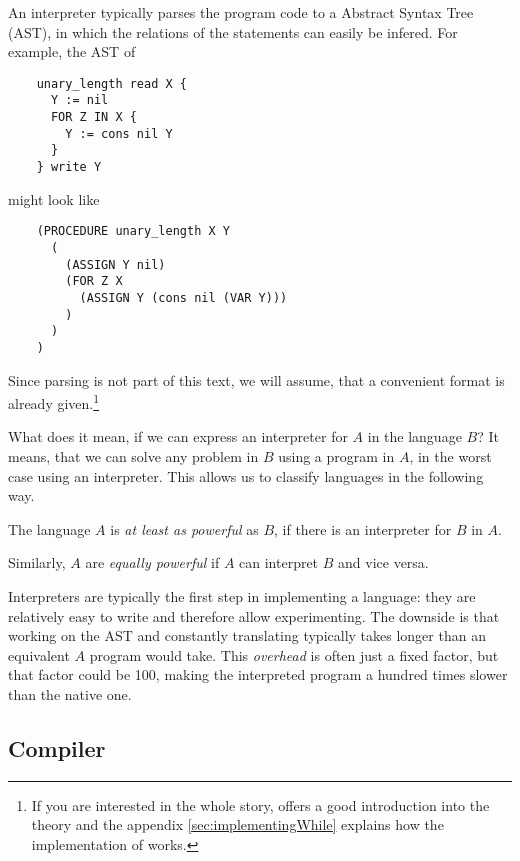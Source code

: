 An interpreter typically parses the program code to a Abstract Syntax Tree 
(AST), in which the relations of the statements can easily be infered. For 
example, the AST of

\begin{verbatim}
	unary_length read X {
	  Y := nil
	  FOR Z IN X {
	    Y := cons nil Y
	  }
	} write Y
\end{verbatim}

might look like

\begin{verbatim}
	(PROCEDURE unary_length X Y
	  (
	    (ASSIGN Y nil)
	    (FOR Z X
	      (ASSIGN Y (cons nil (VAR Y)))
	    )
	  )
	)
\end{verbatim}

Since parsing is not part of this text, we will assume, that a convenient 
format is already given.\footnote{If you are interested in the whole story, 
	\cite{aho2007compilers} offers a good introduction into the theory and the 
	appendix \ref{sec:implementingWhile} explains how the implementation of 
\WHILE works.}

What does it mean, if we can express an interpreter for $A$ in the language 
$B$? It means, that we can solve any problem in $B$ using a program in $A$, 
in the worst case using an interpreter. This allows us to classify languages 
in the following way.

\begin{defn}
	The language $A$ is {\em at least as powerful} as $B$, if there is an 
	interpreter for $B$ in $A$.

	Similarly, $A$ are {\em equally powerful} if $A$ can interpret $B$ and vice versa.
\end{defn}

Interpreters are typically the first step in implementing a language: they 
are relatively easy to write and therefore allow experimenting. The downside 
is that working on the AST and constantly translating typically takes longer 
than an equivalent $A$ program would take. This {\em overhead} is often 
just a fixed factor, but that factor could be 100, making the interpreted program a 
hundred times slower than the native one.

\subsection{Compiler} %
\label{sub:Compiler}
